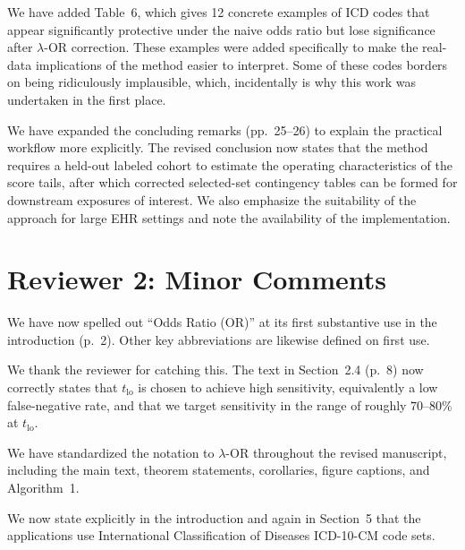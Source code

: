 \documentclass[onecolumn,11pt]{IEEEtran}
\begin{document}
We have added Table~6, which gives 12 concrete examples of ICD codes that appear significantly protective under the naive odds ratio but lose significance after $\lambda$-OR correction. These examples were added specifically to make the real-data implications of the method easier to interpret. Some of these codes borders on being ridiculously implausible, which, incidentally is why this work was undertaken in the first place.

We have expanded the concluding remarks (pp.~25--26) to explain the practical workflow more explicitly. The revised conclusion now states that the method requires a held-out labeled cohort to estimate the operating characteristics of the score tails, after which corrected selected-set contingency tables can be formed for downstream exposures of interest. We also emphasize the suitability of the approach for large EHR settings and note the availability of the implementation.

\section*{Reviewer 2: Minor Comments}

We have now spelled out ``Odds Ratio (OR)'' at its first substantive use in the introduction (p.~2). Other key abbreviations are likewise defined on first use.

We thank the reviewer for catching this. The text in Section~2.4 (p.~8) now correctly states that $t_{\mathrm{lo}}$ is chosen to achieve high sensitivity, equivalently a low false-negative rate, and that we target sensitivity in the range of roughly $70$--$80\%$ at $t_{\mathrm{lo}}$.

We have standardized the notation to $\lambda$-OR throughout the revised manuscript, including the main text, theorem statements, corollaries, figure captions, and Algorithm~1.

We now state explicitly in the introduction and again in Section~5 that the applications use International Classification of Diseases ICD-10-CM code sets.
\end{document}
